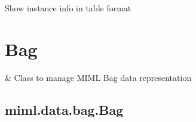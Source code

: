 \documentclass[letterpaper,10pt,english]{sphinxmanual}
\begin{document}
\begin{fulllineitems}
\begin{fulllineitems}
\begin{description}
\end{description}

\end{fulllineitems}


\begin{fulllineitems}
\label{\detokenize{data/_autosummary/miml.data.instance.Instance:miml.data.instance.Instance.show_instance}}
\pysigstartsignatures
{}
\pysigstopsignatures
\sphinxAtStartPar
Show instance info in table format

\end{fulllineitems}


\end{fulllineitems}


\sphinxstepscope


\section{Bag}
\label{\detokenize{data/bag:bag}}\label{\detokenize{data/bag::doc}}

\begin{savenotes}\sphinxattablestart
\sphinxthistablewithglobalstyle
\sphinxthistablewithnovlinesstyle
\centering
\begin{tabulary}{\linewidth}[t]{}
\sphinxtoprule
\sphinxtableatstartofbodyhook
\sphinxAtStartPar
{\hyperref[\detokenize{data/_autosummary/miml.data.bag.Bag:miml.data.bag.Bag}]{}}
&
\sphinxAtStartPar
Class to manage MIML Bag data representation
\\
\sphinxbottomrule
\end{tabulary}
\sphinxtableafterendhook\par
\sphinxattableend\end{savenotes}

\sphinxstepscope


\subsection{miml.data.bag.Bag}
\label{\detokenize{data/_autosummary/miml.data.bag.Bag:miml-data-bag-bag}}\label{\detokenize{data/_autosummary/miml.data.bag.Bag::doc}}
\end{document}
